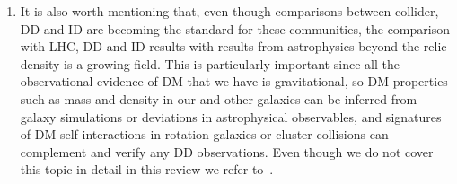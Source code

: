 \begin{issues}
\begin{enumerate}
\item It is also worth mentioning that, even though comparisons between collider, DD and ID are becoming the standard for these communities,
the comparison with LHC, DD and ID results with results from astrophysics beyond the relic density is a growing field. 
This is particularly important since all the observational evidence of DM that we have is gravitational,
so DM properties such as mass and density in our and other galaxies
can be inferred from galaxy simulations or deviations in astrophysical observables, 
and signatures of DM self-interactions in rotation galaxies or cluster collisions can complement and verify any DD 
observations. Even though we do not cover this topic in detail in this review we refer to~\cite{Buckley:2017ijx}. 


\end{enumerate}
\end{issues}







